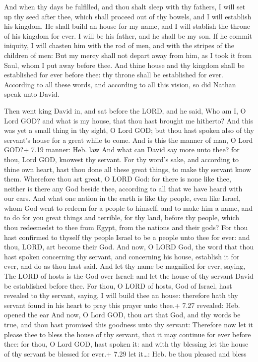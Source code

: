  And when thy days be fulfilled, and thou shalt sleep
with thy fathers, I will set up thy seed after thee, which shall proceed
out of thy bowels, and I will establish his kingdom.  He
shall build an house for my name, and I will stablish the throne of his
kingdom for ever.  I will be his father, and he shall be my
son. If he commit iniquity, I will chasten him with the rod of men, and
with the stripes of the children of men:  But my mercy
shall not depart away from him, as I took it from Saul, whom I put away
before thee.  And thine house and thy kingdom shall be
established for ever before thee: thy throne shall be established for
ever.  According to all these words, and according to all
this vision, so did Nathan speak unto David.

 Then went king David in, and sat before the LORD, and he
said, Who am I, O Lord GOD? and what is my house, that thou hast brought
me hitherto?  And this was yet a small thing in thy sight,
O Lord GOD; but thou hast spoken also of thy servant's house for a great
while to come. And is this the manner of man, O Lord GOD?+ 7.19 manner:
Heb. law  And what can David say more unto thee? for thou,
Lord GOD, knowest thy servant.  For thy word's sake, and
according to thine own heart, hast thou done all these great things, to
make thy servant know them.  Wherefore thou art great, O
LORD God: for there is none like thee, neither is there any God beside
thee, according to all that we have heard with our ears. 
And what one nation in the earth is like thy people, even like Israel,
whom God went to redeem for a people to himself, and to make him a name,
and to do for you great things and terrible, for thy land, before thy
people, which thou redeemedst to thee from Egypt, from the nations and
their gods?  For thou hast confirmed to thyself thy people
Israel to be a people unto thee for ever: and thou, LORD, art become
their God.  And now, O LORD God, the word that thou hast
spoken concerning thy servant, and concerning his house, establish it
for ever, and do as thou hast said.  And let thy name be
magnified for ever, saying, The LORD of hosts is the God over Israel:
and let the house of thy servant David be established before thee.
 For thou, O LORD of hosts, God of Israel, hast revealed to
thy servant, saying, I will build thee an house: therefore hath thy
servant found in his heart to pray this prayer unto thee.+ 7.27
revealed: Heb. opened the ear  And now, O Lord GOD, thou
art that God, and thy words be true, and thou hast promised this
goodness unto thy servant:  Therefore now let it please
thee to bless the house of thy servant, that it may continue for ever
before thee: for thou, O Lord GOD, hast spoken it: and with thy blessing
let the house of thy servant be blessed for ever.+ 7.29 let it\ldots:
Heb. be thou pleased and bless

